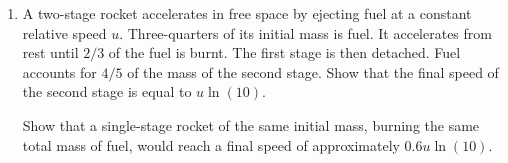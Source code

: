 \documentclass[12pt]{article}
\begin{document}
\begin{enumerate}
\item A two-stage rocket accelerates in free space by ejecting fuel at a
  constant relative speed $u$. Three-quarters of its initial mass is
  fuel. It accelerates from rest until $2/3$ of the fuel is burnt. The
  first stage is then detached. Fuel accounts for $4/5$ of the mass of
  the second stage. Show that the final speed of the second stage is
  equal to $u\ln(10)$.

  Show that a single-stage rocket of the same initial mass, burning 
  the same total mass of fuel, would reach a final speed of 
  approximately $0.6u\ln(10)$.

\end{enumerate}


  
%
\end{document}
